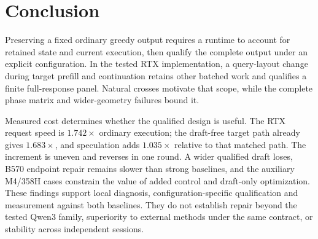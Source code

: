 \section{Conclusion}
Preserving a fixed ordinary greedy output requires a runtime to account for retained state and current execution, then qualify the complete output under an explicit configuration. In the tested RTX implementation, a query-layout change during target prefill and continuation retains other batched work and qualifies a finite full-response panel. Natural crosses motivate that scope, while the complete phase matrix and wider-geometry failures bound it.

Measured cost determines whether the qualified design is useful. The RTX request speed is $1.742\times$ ordinary execution; the draft-free target path already gives $1.683\times$, and speculation adds $1.035\times$ relative to that matched path. The increment is uneven and reverses in one round. A wider qualified draft loses, B570 endpoint repair remains slower than strong baselines, and the auxiliary M4/358H cases constrain the value of added control and draft-only optimization. These findings support local diagnosis, configuration-specific qualification and measurement against both baselines. They do not establish repair beyond the tested Qwen3 family, superiority to external methods under the same contract, or stability across independent sessions.

